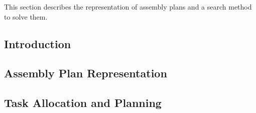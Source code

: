 This section describes the representation of assembly plans and a search method to solve them.

\subsection{Introduction}\label{ch:foundations:planning:introduction}

\subsection{Assembly Plan Representation}\label{ch:foundations:planning:representation}

\subsection{Task Allocation and Planning}\label{ch:foundations:planning:planning}
